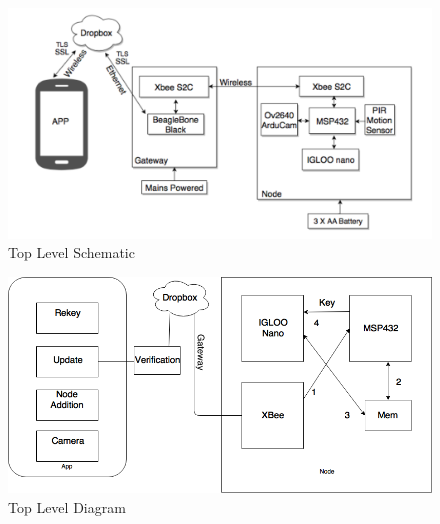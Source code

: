 \documentclass[11pt]{article}
\begin{document}
\begin{figure}[!ht]
\centering
\includegraphics[scale = 0.6]{schematic1.png}
\caption{Top Level Schematic}
\end{figure}

\begin{figure}[!ht]
\centering
\includegraphics[scale = 0.6]{Diagram1.png}
\caption{Top Level Diagram}
\end{figure}
\end{document}
